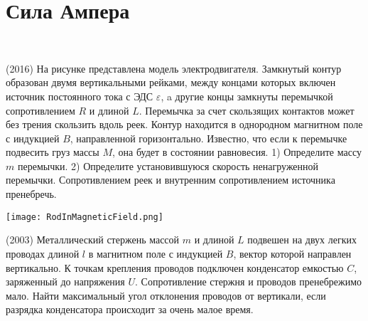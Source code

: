 \section{Сила Ампера}

\begin{ex}
\hspace{0pt} \\
\begin{minipage}{.65\textwidth}
(2016) На рисунке представлена модель электродвигателя. Замкнутый контур образован двумя вертикальными рейками, между концами которых включен источник постоянного тока с ЭДС {\Large $\varepsilon$}, a другие концы замкнуты перемычкой сопротивлением $R$ и длиной $L$. Перемычка за счет скользящих контактов может без трения скользить вдоль реек. Контур находится в однородном магнитном поле с индукцией $B$, направленной горизонтально. Известно, что если к перемычке подвесить груз массы $M$, она будет в состоянии равновесия. 1) Определите массу $m$ перемычки. 2) Определите установившуюся скорость ненагруженной перемычки. Сопротивлением реек и внутренним сопротивлением источника пренебречь.
\end{minipage}
\begin{minipage}{.35\textwidth}
\centering
\texttt{[image: RodInMagneticField.png]}
\end{minipage}
\begin{ans}
\end{ans}
\end{ex}

\begin{ex}
(2003) Металлический стержень массой $m$ и длиной $L$ подвешен на двух легких проводах длиной $l$ в магнитном поле с индукцией $B$, 
вектор которой направлен вертикально. К точкам крепления проводов подключен конденсатор емкостью $C$, заряженный до напряжения $U$. 
Сопротивление стержня и проводов пренебрежимо мало. Найти максимальный угол отклонения проводов от вертикали, если разрядка конденсатора происходит за очень малое время.
\begin{ans}
\end{ans}
\end{ex}

